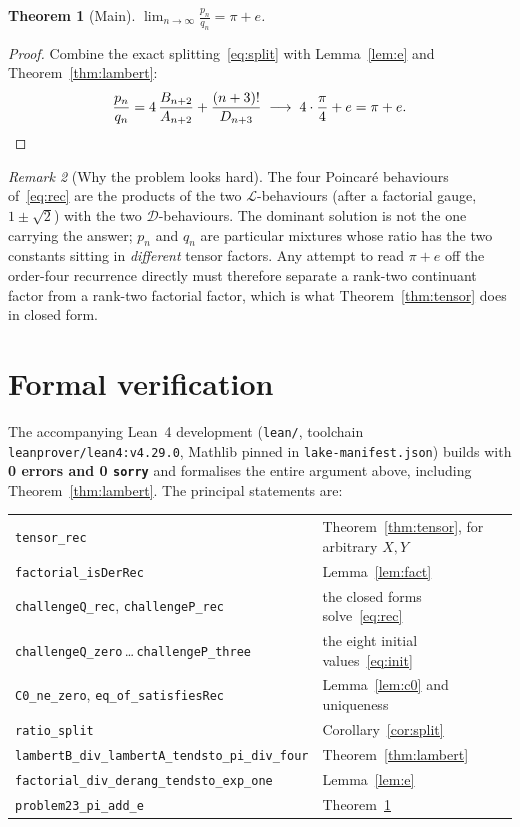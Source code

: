 \documentclass[11pt]{article}
\newtheorem{theorem}{Theorem}[section]
\theoremstyle{remark}
\newtheorem{remark}[theorem]{Remark}
\begin{document}
\begin{theorem}[Main]\label{thm:main}
$\displaystyle\lim_{n\to\infty}\frac{p_n}{q_n} = \pi + e$.
\end{theorem}

\begin{proof}
Combine the exact splitting~\eqref{eq:split} with Lemma~\ref{lem:e} and
Theorem~\ref{thm:lambert}:
\[
\frac{p_n}{q_n} = 4\,\frac{B_{n+2}}{A_{n+2}} + \frac{(n+3)!}{D_{n+3}}
\;\longrightarrow\; 4\cdot\frac{\pi}{4} + e = \pi + e. \qedhere
\]
\end{proof}

\begin{remark}[Why the problem looks hard]
The four Poincar\'e behaviours of~\eqref{eq:rec} are the products of the two
$\mathcal{L}$-behaviours (after a factorial gauge, $1\pm\sqrt2$) with the two
$\mathcal{D}$-behaviours. The dominant solution is not the one carrying the
answer; $p_n$ and $q_n$ are particular mixtures whose ratio has the two
constants sitting in \emph{different} tensor factors. Any attempt to read
$\pi+e$ off the order-four recurrence directly must therefore separate a
rank-two continuant factor from a rank-two factorial factor, which is what
Theorem~\ref{thm:tensor} does in closed form.
\end{remark}

\section{Formal verification}\label{sec:formal}

The accompanying Lean~4 development (\texttt{lean/}, toolchain
\texttt{leanprover/lean4:v4.29.0}, Mathlib pinned in \texttt{lake-manifest.json})
builds with \textbf{0 errors and 0 \texttt{sorry}} and formalises the entire
argument above, including Theorem~\ref{thm:lambert}. The principal statements are:

\begin{center}
\begin{tabular}{ll}
\texttt{tensor\_rec} & Theorem~\ref{thm:tensor}, for arbitrary $X,Y$\\
\texttt{factorial\_isDerRec} & Lemma~\ref{lem:fact}\\
\texttt{challengeQ\_rec}, \texttt{challengeP\_rec} & the closed forms solve~\eqref{eq:rec}\\
\texttt{challengeQ\_zero}\,\dots\,\texttt{challengeP\_three} & the eight initial values~\eqref{eq:init}\\
\texttt{C0\_ne\_zero}, \texttt{eq\_of\_satisfiesRec} & Lemma~\ref{lem:c0} and uniqueness\\
\texttt{ratio\_split} & Corollary~\ref{cor:split}\\
\texttt{lambertB\_div\_lambertA\_tendsto\_pi\_div\_four} & Theorem~\ref{thm:lambert}\\
\texttt{factorial\_div\_derang\_tendsto\_exp\_one} & Lemma~\ref{lem:e}\\
\texttt{problem23\_pi\_add\_e} & Theorem~\ref{thm:main}\\
\end{tabular}
\end{center}
\end{document}
